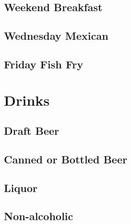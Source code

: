 \documentclass[11pt]{article}
\begin{document}
\subsection{Weekend Breakfast}
\label{sec-2-2}

\subsection{Wednesday Mexican}
\label{sec-2-3}

\subsection{Friday Fish Fry}
\label{sec-2-4}

\section{Drinks}
\label{sec-3}

\subsection{Draft Beer}
\label{sec-3-1}

\subsection{Canned or Bottled Beer}
\label{sec-3-2}

\subsection{Liquor}
\label{sec-3-3}

\subsection{Non-alcoholic}
\label{sec-3-4}
\end{document}
